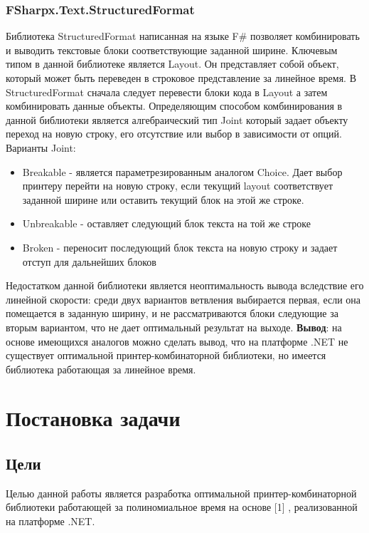 \documentclass{matmex-diploma}
\begin{document}
\subsubsection{FSharpx.Text.StructuredFormat}
Библиотека StructuredFormat написанная на языке F\# позволяет комбинировать и выводить текстовые блоки соответствующие заданной ширине.
Ключевым типом в данной библиотеке является Layout. Он представляет собой объект, который может быть переведен в строковое представление за линейное время.
В StructuredFormat сначала следует перевести блоки кода в Layout а затем комбинировать данные объекты.
Определяющим способом комбинирования в данной библиотеки является алгебраический тип Joint который задает объекту переход на новую строку, его отсутствие или выбор в зависимости от опций.
Варианты Joint:
\begin{itemize}
    \item Breakable - является параметрезированным аналогом Choice. Дает выбор принтеру перейти на новую строку, если текущий layout соответствует заданной ширине  или оставить текущий блок на этой же строке.
    \item Unbreakable - оставляет следующий блок текста на той же строке
    \item Broken - переносит последующий блок текста на новую строку и задает отступ для дальнейших блоков
\end{itemize}
Недостатком данной библиотеки является неоптимальность вывода вследствие его линейной скорости: среди двух вариантов ветвления выбирается первая, если она помещается в заданную ширину, и не рассматриваются блоки следующие за вторым вариантом, что не дает оптимальный результат на выходе.
\textbf{Вывод}: на основе имеющихся аналогов можно сделать вывод, что на платформе .NET не существует оптимальной принтер-комбинаторной библиотеки, но имеется библиотека работающая за линейное время.
\section{Постановка задачи}
\subsection{Цели}Целью данной работы является разработка оптимальной принтер-комбинаторной библиотеки работающей за полиномиальное время на основе [1] , реализованной на платформе .NET.
\end{document}

